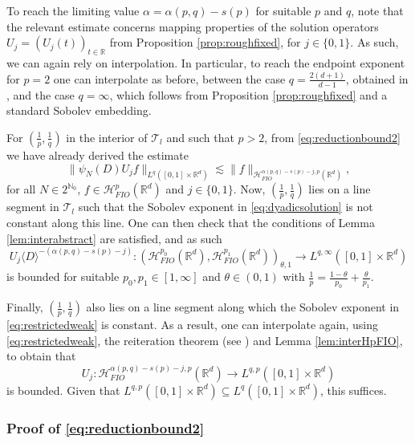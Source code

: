 \documentclass{amsart}
\numberwithin{equation}{section}
\theoremstyle{definition}
\newcommand{\R}{\mathbb{R}}
\newcommand{\Rd}{\mathbb{R}^{d}}
\newcommand{\N}{\mathbb{N}}
\newcommand {\HT}{\mathcal{H}}
\newcommand {\Hp}{\mathcal{H}^{p}_{FIO}(\R^d)}
\newcommand {\rb}{\rangle}
\newcommand {\lb}{\langle}
\begin{document}
To reach the limiting value $\alpha=\alpha(p,q)-s(p)$ for suitable $p$ and $q$, note that the relevant estimate concerns mapping properties of the solution operators $U_{j}=(U_{j}(t))_{t\in\R}$ from Proposition \ref{prop:roughfixed}, for $j\in\{0,1\}$. As such, we can again rely on interpolation. In particular, to reach the endpoint exponent for $p=2$ one can interpolate as before, between the case $q=\frac{2(d+1)}{d-1}$, obtained in \cite{Tataru2001}, and the case $q=\infty$, which follows from Proposition \ref{prop:roughfixed} and a standard Sobolev embedding. 

For $(\frac{1}{p},\frac{1}{q})$ in the interior of $\mathcal{T}_{l}$ and such that $p>2$, from \eqref{eq:reductionbound2} we have already derived the estimate
\begin{equation}\label{eq:dyadicsolution}
\|\psi_{N}(D)U_{j}f\|_{L^{q}([0,1]\times\Rd)}\lesssim \|f\|_{\HT^{\alpha(p,q)-s(p)-j,p}_{FIO}(\Rd)},
\end{equation}
for all $N\in 2^{\N_{0}}$, $f\in\Hp$ and $j\in\{0,1\}$. Now, $(\frac{1}{p},\frac{1}{q})$ lies on a line segment in $\mathcal{T}_{l}$ such that the Sobolev exponent in \eqref{eq:dyadicsolution} is not constant along this line. %
One can then check that the conditions of Lemma \ref{lem:interabstract} are satisfied, and as such
\begin{equation}\label{eq:restrictedweak}
U_{j}\lb D\rb^{-(\alpha(p,q)-s(p)-j)}:(\HT^{p_{0}}_{FIO}(\Rd),\HT^{p_{1}}_{FIO}(\Rd))_{\theta,1}\to L^{q,\infty}([0,1]\times\Rd)
\end{equation}
is bounded for suitable $p_{0},p_{1}\in[1,\infty]$ and $\theta\in(0,1)$ with $\frac{1}{p}=\frac{1-\theta}{p_{0}}+\frac{\theta}{p_{1}}$.

Finally, %
$(\frac{1}{p},\frac{1}{q})$ %
also lies on a line segment along which the Sobolev exponent in \eqref{eq:restrictedweak} is constant. As a result, one can interpolate again, using \eqref{eq:restrictedweak}, the reiteration theorem (see \cite[Theorem 3.5.3]{Bergh-Lofstrom76}) and Lemma \ref{lem:interHpFIO}, to obtain that
\[
U_{j}:\HT^{\alpha(p,q)-s(p)-j,p}_{FIO}(\Rd)\to L^{q,p}([0,1]\times\Rd)
\]
is bounded. Given that $L^{q,p}([0,1]\times\Rd)\subseteq L^{q}([0,1]\times\Rd)$, this suffices.

\subsubsection*{Proof of \eqref{eq:reductionbound2}}%
\end{document}
